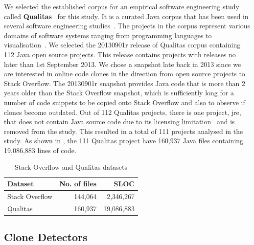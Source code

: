 \documentclass[sigconf,review, anonymous]{acmart}
\begin{document}
We selected the established corpus for an empirical software
engineering study called \textbf{Qualitas}~\cite{QualitasCorpus} for
this study. It is a curated Java corpus that has been used in several
software engineering
studies~\cite{Taube-Schock2011,Beckman2011,Vasilescu2011,Omar2012}. The
projects in the corpus represent various domains of software systems
ranging from programming languages to
visualisation~\cite{QualitasCorpus}. We selected the 20130901r release
of Qualitas corpus containing 112 Java open source projects. This
release contains projects with releases no later than 1st September
2013. We chose a snapshot late back in 2013 since we are interested in
online code clones in the direction from open source projects to Stack
Overflow. The 20130901r snapshot provides Java code that is more than
2 years older than the Stack Overflow snapshot, which is sufficiently
long for a number of code snippets to be copied onto Stack Overflow
and also to observe if clones become outdated. Out of 112 Qualitas
projects, there is one project, \textsf{jre}, that does not contain
Java source code due to its licensing limitation~\cite{QualitasCorpus}
and is removed from the study. This resulted in a total of 111
projects analysed in the study. As shown in , the
111 Qualitas project have 160,937 Java files containing 19,086,883
lines of
code. %

\begin{table}
  \centering
  \caption{Stack Overflow and Qualitas datasets}
  \label{tab:datasets}
  \small
  \begin{tabular}{lrr}
    \hline 
    Dataset & No. of files & SLOC \\
    \hline
    Stack Overflow & 144,064 & 2,346,267 \\ 
    Qualitas &  160,937 & 19,086,883 \\ 
    \hline 
  \end{tabular} 
\end{table}

\subsection{Clone Detectors}
\end{document}
